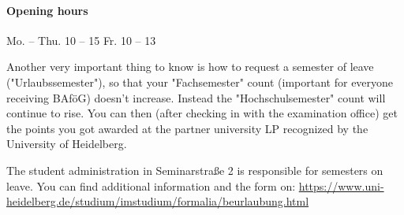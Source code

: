 \paragraph{Opening hours} Mo. -- Thu. 10 -- 15 \qquad Fr. 10 -- 13

Another very important thing to know is how to request a semester of leave ("Urlaubssemester"), so that your "Fachsemester" count (important for everyone receiving BAföG) doesn't increase. Instead the "Hochschulsemester" count will continue to rise. You can then (after checking in with the examination office) get the points you got awarded at the partner university \gls{LP} recognized by the University of Heidelberg.

The student administration in Seminarstraße 2 is responsible for semesters on leave. You can find additional information and the form on:
\url{https://www.uni-heidelberg.de/studium/imstudium/formalia/beurlaubung.html}

